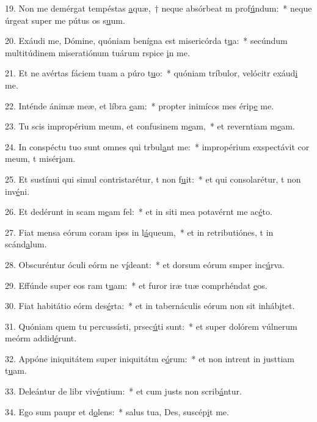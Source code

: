 19. Non me demérgat tempéstas \uline{a}quæ,~† neque absórbeat m prof\uline{ú}ndum:~* neque úrgeat super me pútus os s\uline{u}um.\par 
20. Exáudi me, Dómine, quóniam benígna est misericórda t\uline{u}a:~* secúndum multitúdinem miseratiónum tuárum rspice \uline{i}n me.\par 
21. Et ne avértas fáciem tuam a púro t\uline{u}o:~* quóniam tríbulor, velócitr exáud\uline{i} me.\par 
22. Inténde ánimæ meæ, et líbra \uline{e}am:~* propter inimícos mes érip\uline{e} me.\par 
23. Tu scis impropérium meum, et confusinem m\uline{e}am,~* et reverntiam m\uline{e}am.\par 
24. In conspéctu tuo sunt omnes qui trbul\uline{a}nt me:~* impropérium exspectávit cor meum, t misér\uline{i}am.\par 
25. Et sustínui qui simul contristarétur, t non f\uline{u}it:~* et qui consolarétur, t non inv\uline{é}ni.\par 
26. Et dedérunt in scam m\uline{e}am fel:~* et in siti mea potavérnt me ac\uline{é}to.\par 
27. Fiat mensa eórum coram ipss in l\uline{á}queum,~* et in retributiónes, t in scánd\uline{a}lum.\par 
28. Obscuréntur óculi eórm ne v\uline{í}deant:~* et dorsum eórum smper inc\uline{ú}rva.\par 
29. Effúnde super eos ram t\uline{u}am:~* et furor iræ tuæ comprhéndat \uline{e}os.\par 
30. Fiat habitátio eórm des\uline{é}rta:~* et in tabernáculis eórum non sit  inháb\uline{i}tet.\par 
31. Quóniam quem tu percussísti, prsec\uline{ú}ti sunt:~* et super dolórem vúlnerum meórm addid\uline{é}runt.\par 
32. Appóne iniquitátem super iniquitátm e\uline{ó}rum:~* et non intrent in justtiam t\uline{u}am.\par 
33. Deleántur de libr viv\uline{é}ntium:~* et cum justs non scrib\uline{á}ntur.\par 
34. Ego sum paupr et d\uline{o}lens:~* salus tua, Des, suscép\uline{i}t me.\par 
